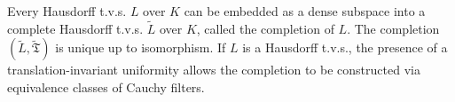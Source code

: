 Every Hausdorff t.v.s. $L$ over $K$ can be embedded as a dense subspace into a complete Hausdorff t.v.s. $\tilde{L}$ over $K$, called the completion of $L$. The completion $(\tilde{L}, \tilde{\mathfrak{T}})$ is unique up to isomorphism. If $L$ is a Hausdorff t.v.s., the presence of a translation-invariant uniformity allows the completion to be constructed via equivalence classes of Cauchy filters.
